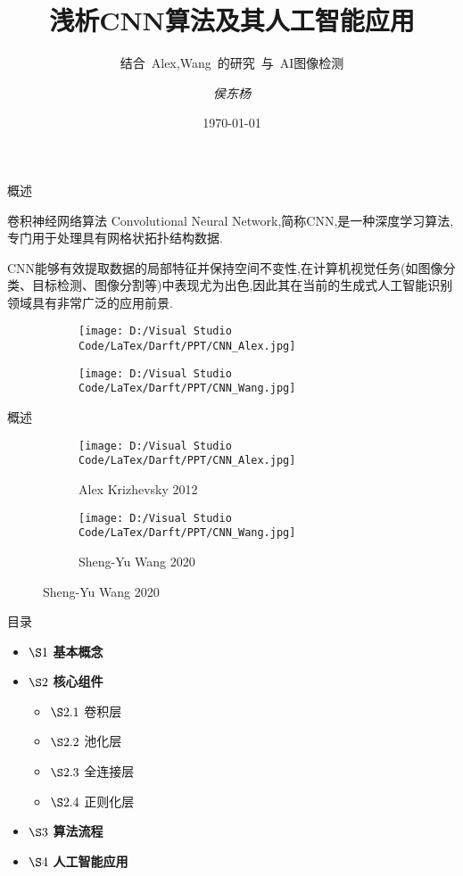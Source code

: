 \documentclass{beamer}
\title{\textbf{浅析CNN算法及其人工智能应用}}
\subtitle{结合~Alex,Wang~的研究~与~AI图像检测}
\author{\textit{侯东杨}}
\date{\today}
\institute{\textit{北京林业大学~理学院}}
\begin{document}
\begin{frame}
    \titlepage
\end{frame}

\begin{frame}{概述}
    \begin{block}{卷积神经网络算法}
        Convolutional Neural Network,简称CNN,是一种深度学习算法,专门用于处理具有网格状拓扑结构数据.
    \end{block}
    CNN能够有效提取数据的局部特征并保持空间不变性,在计算机视觉任务(如图像分类、目标检测、图像分割等)中表现尤为出色,因此其在当前的生成式人工智能识别领域具有非常广泛的应用前景.
    \begin{figure}
        \centering
        \begin{subfigure}{0.27\textwidth}
            \centering
            \texttt{[image: D:/Visual Studio Code/LaTex/Darft/PPT/CNN\_Alex.jpg]}
        \end{subfigure}
        \textwidth
        \begin{subfigure}{0.27\textwidth}
            \centering
            \texttt{[image: D:/Visual Studio Code/LaTex/Darft/PPT/CNN\_Wang.jpg]}
        \end{subfigure}
    \end{figure}
\end{frame}

\begin{frame}{概述}
    \begin{figure}
        \centering
        \begin{subfigure}{0.4\textwidth}
            \centering
            \texttt{[image: D:/Visual Studio Code/LaTex/Darft/PPT/CNN\_Alex.jpg]}
            \caption{Alex Krizhevsky 2012}
        \end{subfigure}
        \textwidth
        \begin{subfigure}{0.4\textwidth}
            \centering
            \texttt{[image: D:/Visual Studio Code/LaTex/Darft/PPT/CNN\_Wang.jpg]}
            \caption{Sheng-Yu Wang 2020}
        \end{subfigure}
    \end{figure}
\end{frame}

\begin{frame}{目录}
    \begin{itemize}
        \item $\S1~$\textbf{基本概念}
        \item $\S2~$\textbf{核心组件}
        \begin{itemize}
            \item $\S2.1~$卷积层
            \item $\S2.2~$池化层
            \item $\S2.3~$全连接层
            \item $\S2.4~$正则化层
        \end{itemize}
        \item $\S3~$\textbf{算法流程}
        \item $\S4~$\textbf{人工智能应用}
    \end{itemize}
\end{frame}
\end{document}
